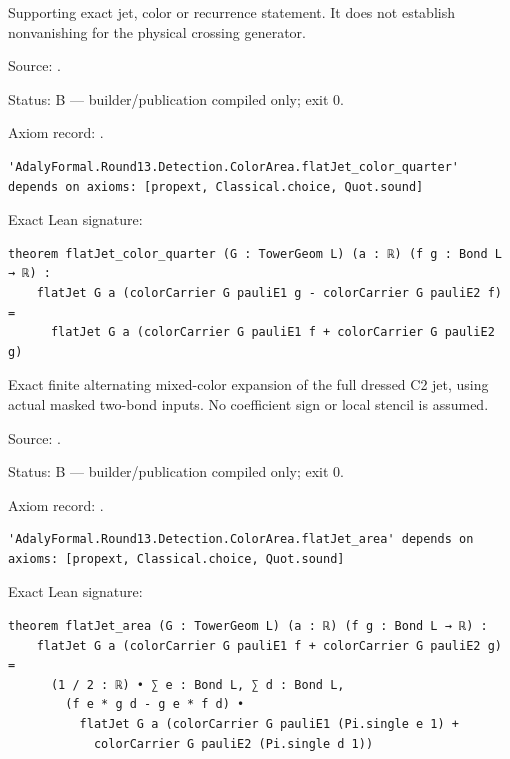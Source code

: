 \begin{theorem}[bp-530]
\label{bp-530}
\leanok
Supporting exact jet, color or recurrence statement. It does not establish nonvanishing for the physical crossing generator.

\par Source: \texttt{}.
\par Status: B — builder/publication compiled only; exit 0.
\par Axiom record: \texttt{}.
\begin{verbatim}
'AdalyFormal.Round13.Detection.ColorArea.flatJet_color_quarter' depends on axioms: [propext, Classical.choice, Quot.sound]
\end{verbatim}
\par Exact Lean signature:
\begin{verbatim}
theorem flatJet_color_quarter (G : TowerGeom L) (a : ℝ) (f g : Bond L → ℝ) :
    flatJet G a (colorCarrier G pauliE1 g - colorCarrier G pauliE2 f) =
      flatJet G a (colorCarrier G pauliE1 f + colorCarrier G pauliE2 g)
\end{verbatim}
\end{theorem}

\begin{theorem}[bp-531]
\label{bp-531}
\leanok
Exact finite alternating mixed-color expansion of the full dressed C2 jet, using actual masked two-bond inputs. No coefficient sign or local stencil is assumed.

\par Source: \texttt{}.
\par Status: B — builder/publication compiled only; exit 0.
\par Axiom record: \texttt{}.
\begin{verbatim}
'AdalyFormal.Round13.Detection.ColorArea.flatJet_area' depends on axioms: [propext, Classical.choice, Quot.sound]
\end{verbatim}
\par Exact Lean signature:
\begin{verbatim}
theorem flatJet_area (G : TowerGeom L) (a : ℝ) (f g : Bond L → ℝ) :
    flatJet G a (colorCarrier G pauliE1 f + colorCarrier G pauliE2 g) =
      (1 / 2 : ℝ) • ∑ e : Bond L, ∑ d : Bond L,
        (f e * g d - g e * f d) •
          flatJet G a (colorCarrier G pauliE1 (Pi.single e 1) +
            colorCarrier G pauliE2 (Pi.single d 1))
\end{verbatim}
\end{theorem}

